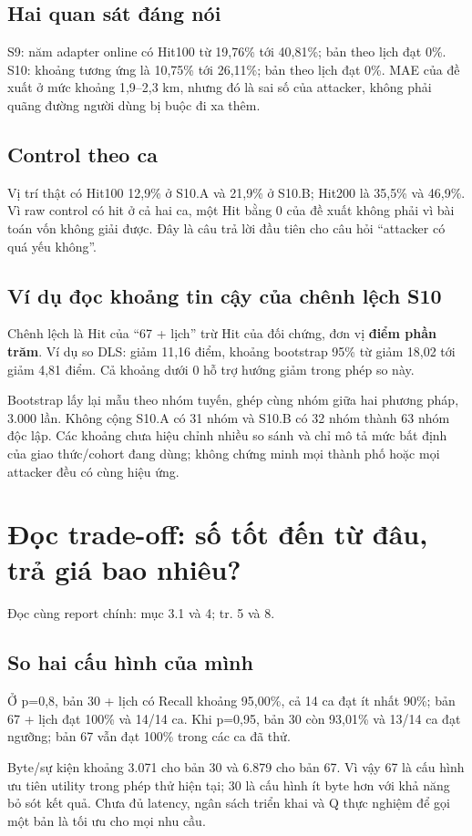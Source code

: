 \documentclass[10pt,a4paper]{article}
\newcommand{\where}[1]{\par{\small\color{gray}Đọc cùng report chính: #1.}\par}
\newcommand{\guidepage}[1]{\clearpage\section{#1}}
\begin{document}
\subsection*{Hai quan sát đáng nói}
S9: năm adapter online có Hit100 từ 19,76\% tới 40,81\%; bản theo lịch đạt 0\%. S10: khoảng tương ứng là 10,75\% tới 26,11\%; bản theo lịch đạt 0\%. MAE của đề xuất ở mức khoảng 1,9--2,3 km, nhưng đó là sai số của attacker, không phải quãng đường người dùng bị buộc đi xa thêm.

\subsection*{Control theo ca}
Vị trí thật có Hit100 12,9\% ở S10.A và 21,9\% ở S10.B; Hit200 là 35,5\% và 46,9\%. Vì raw control có hit ở cả hai ca, một Hit bằng 0 của đề xuất không phải vì bài toán vốn không giải được. Đây là câu trả lời đầu tiên cho câu hỏi ``attacker có quá yếu không''.

\subsection*{Ví dụ đọc khoảng tin cậy của chênh lệch S10}
\EndpointContrasts
Chênh lệch là Hit của ``67 + lịch'' trừ Hit của đối chứng, đơn vị \textbf{điểm phần trăm}. Ví dụ so DLS: giảm 11,16 điểm, khoảng bootstrap 95\% từ giảm 18,02 tới giảm 4,81 điểm. Cả khoảng dưới 0 hỗ trợ hướng giảm trong phép so này.

Bootstrap lấy lại mẫu theo nhóm tuyến, ghép cùng nhóm giữa hai phương pháp, 3.000 lần. Không cộng S10.A có 31 nhóm và S10.B có 32 nhóm thành 63 nhóm độc lập. Các khoảng chưa hiệu chỉnh nhiều so sánh và chỉ mô tả mức bất định của giao thức/cohort đang dùng; không chứng minh mọi thành phố hoặc mọi attacker đều có cùng hiệu ứng.

\guidepage{Đọc trade-off: số tốt đến từ đâu, trả giá bao nhiêu?}
\where{mục 3.1 và 4; tr. 5 và 8}
\subsection*{So hai cấu hình của mình}
Ở p=0,8, bản 30 + lịch có Recall khoảng 95,00\%, cả 14 ca đạt ít nhất 90\%; bản 67 + lịch đạt 100\% và 14/14 ca. Khi p=0,95, bản 30 còn 93,01\% và 13/14 ca đạt ngưỡng; bản 67 vẫn đạt 100\% trong các ca đã thử.

Byte/sự kiện khoảng 3.071 cho bản 30 và 6.879 cho bản 67. Vì vậy 67 là cấu hình ưu tiên utility trong phép thử hiện tại; 30 là cấu hình ít byte hơn với khả năng bỏ sót kết quả. Chưa đủ latency, ngân sách triển khai và Q thực nghiệm để gọi một bản là tối ưu cho mọi nhu cầu.
\end{document}
